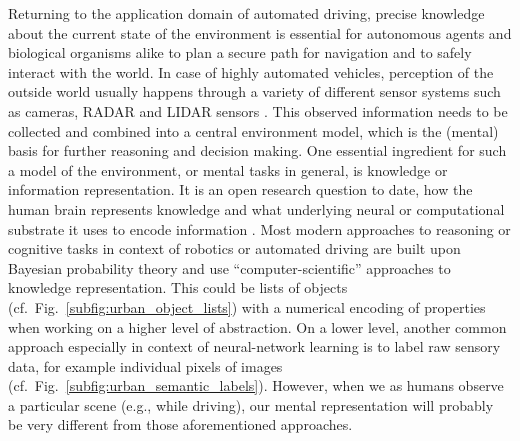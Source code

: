 Returning to the application domain of automated driving, precise knowledge about the current state of the environment is essential for autonomous agents and biological organisms alike to plan a secure path for navigation and to safely interact with the world.
In case of highly automated vehicles, perception of the outside world usually happens through a variety of different sensor systems such as cameras, \acs{RADAR} and \acs{LIDAR} sensors \parencite{Aeberhard2015}.
This observed information needs to be collected and combined into a central environment model, which is the (mental) basis for further reasoning and decision making.
One essential ingredient for such a model of the environment, or mental tasks in general, is knowledge or information representation.
It is an open research question to date, how the human brain represents knowledge and what underlying neural or computational substrate it uses to encode information \parencite{Wang2003, Samsonovich2012, Handjaras2016}.
Most modern approaches to reasoning or cognitive tasks in context of robotics or automated driving are built upon Bayesian probability theory and use \enquote{computer-scientific} approaches to knowledge representation.
This could be lists of objects (cf.~Fig.~\ref{subfig:urban_object_lists}) with a numerical encoding of properties when working on a higher level of abstraction.
On a lower level, another common approach especially in context of neural-network learning is to label raw sensory data, for example individual pixels of images (cf.~Fig.~\ref{subfig:urban_semantic_labels}).
However, when we as humans observe a particular scene (e.g., while driving), our mental representation will probably be very different from those aforementioned approaches.

